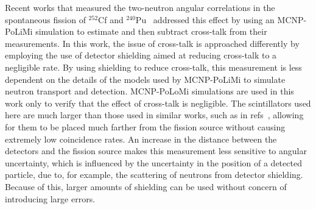Recent works that measured the two-neutron angular correlations in the spontaneous fission of $^{252}$Cf and $^{240}$Pu~\cite{Pozzi2016,Verbeke2018} addressed this effect by using an MCNP-PoLiMi simulation to estimate and then subtract cross-talk from their measurements.
In this work, the issue of cross-talk is approached differently by employing the use of detector shielding aimed at reducing cross-talk to a negligible rate.
By using shielding to reduce cross-talk, this measurement is less dependent on the details of the models used by MCNP-PoLiMi to simulate neutron transport and detection.
MCNP-PoLoMi simulations are used in this work only to verify that the effect of cross-talk is negligible.
The scintillators used here are much larger than those used in similar works, such as in refs~\cite{Pozzi2016,Verbeke2018}, allowing for them to be placed much farther from the fission source without causing extremely low coincidence rates. 
An increase in the distance between the detectors and the fission source makes this measurement less sensitive to angular uncertainty, which is influenced by the uncertainty in the position of a detected particle, due to, for example, the scattering of neutrons from detector shielding.
Because of this, larger amounts of shielding can be used without concern of introducing large errors.

